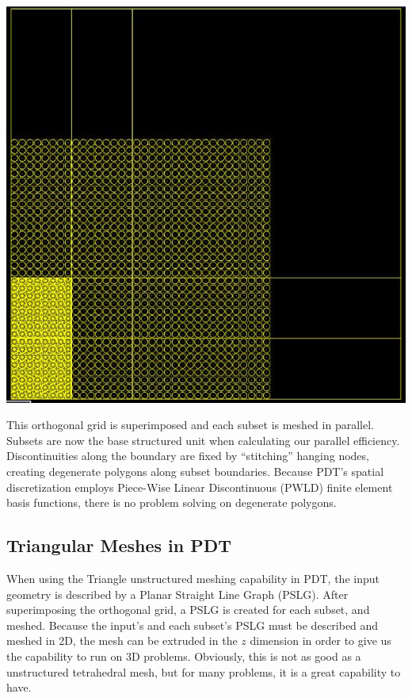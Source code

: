 \documentclass[11pt, letterpaper,titlepage,oneside]{article}
\begin{document}
\begin{minipage}{\textwidth}
\includegraphics[scale = 0.5]{../figures/subsetlattice.png}
\label{grid}
\end{minipage}

This orthogonal grid is superimposed and each subset is meshed in parallel.  Subsets are now the base structured unit when calculating our parallel efficiency. Discontinuities along the boundary are fixed by ``stitching'' hanging nodes, creating degenerate polygons along subset boundaries. Because PDT's spatial discretization employs Piece-Wise Linear Discontinuous (PWLD) finite element basis functions, there is no problem solving on degenerate polygons. 

\subsection{Triangular Meshes in PDT}

When using the Triangle unstructured meshing capability in PDT, the input geometry is described by a Planar Straight Line Graph (PSLG). After superimposing the orthogonal grid, a PSLG is created for each subset, and meshed.  Because the input's and each subset's PSLG must be described and meshed in 2D, the mesh can be extruded in the $z$ dimension in order to give us the capability to run on 3D problems. Obviously, this is not as good as a unstructured tetrahedral mesh, but for many problems, it is a great capability to have. 
\end{document}
